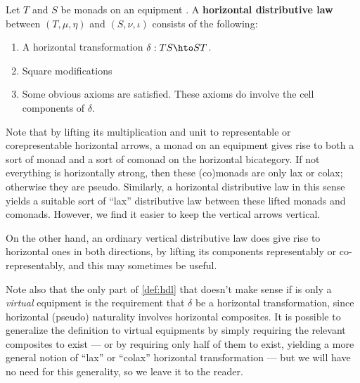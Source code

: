 \documentclass{amsart}
\newcommand{\K}{\bbK}
\begin{document}
\begin{defn}\label{def:hdl}
  Let $T$ and $S$ be monads on an equipment \K.
  A \textbf{horizontal distributive law} between $(T,\mu,\eta)$ and $(S,\nu,\iota)$ consists of the following:
  \begin{enumerate}
    \item A horizontal transformation $\delta : T S \hto S T$.
    \item Square modifications

    \item Some obvious axioms are satisfied.
      These axioms do involve the cell components of $\delta$.
  \end{enumerate}
\end{defn}

Note that by lifting its multiplication and unit to representable or corepresentable horizontal arrows, a monad on an equipment gives rise to both a sort of monad and a sort of comonad on the horizontal bicategory.
If not everything is horizontally strong, then these (co)monads are only lax or colax; otherwise they are pseudo.
Similarly, a horizontal distributive law in this sense yields a suitable sort of ``lax'' distributive law between these lifted monads and comonads.
However, we find it easier to keep the vertical arrows vertical.

On the other hand, an ordinary vertical distributive law does give rise to horizontal ones in both directions, by lifting its components representably or co-representably, and this may sometimes be useful.

Note also that the only part of \cref{def:hdl} that doesn't make sense if \K is only a \emph{virtual} equipment is the requirement that $\delta$ be a horizontal transformation, since horizontal (pseudo) naturality involves horizontal composites.
It is possible to generalize the definition to virtual equipments by simply requiring the relevant composites to exist --- or by requiring only half of them to exist, yielding a more general notion of ``lax'' or ``colax'' horizontal transformation --- but we will have no need for this generality, so we leave it to the reader.
\end{document}
